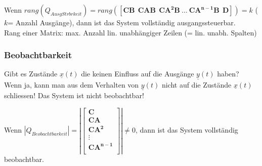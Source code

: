 Wenn $rang(Q_{AusgStrbrkeit}) = rang \left( \left [ \boldsymbol{CB~~ CAB~~ CA^2B~\ldots~
CA^{n-1}B ~~ D}\right ] \right) = k$ ($k$= Anzahl Ausgänge), dann ist das System vollständig ausgangssteuerbar. \\
Rang einer Matrix: max. Anzahl lin. unabhängiger Zeilen (= lin. unabh. Spalten)

\subsubsection{Beobachtbarkeit  }
Gibt es Zustände $\underline{x}(t)$ die keinen Einfluss auf die Ausgänge
$\underline{y}(t)$ haben? Wenn ja, kann man aus dem Verhalten von 
$\underline{y}(t)$ nicht auf die Zustände $\underline{x}(t)$ schliessen!
Das System ist nicht beobachtbar!


Wenn $|Q_{Beobachtbarkeit}| = \left| \left [ \boldsymbol{
\begin{array}{c}
 C\\
 CA\\
CA^2\\
\vdots \\
CA^{n-1}\\
\end{array}}\right ] \right| \neq 0$, dann ist das System vollständig
beobachtbar.

